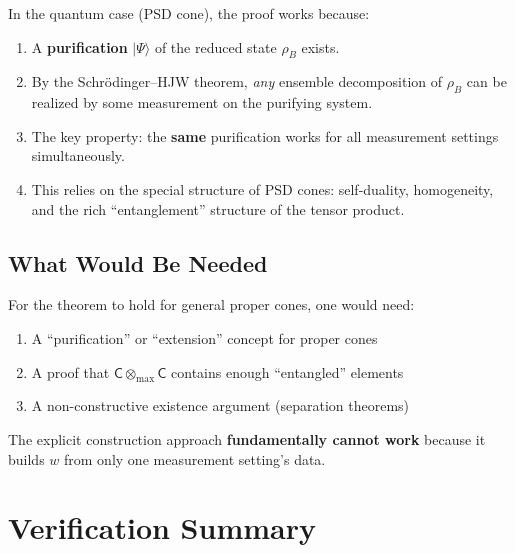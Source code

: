 \documentclass[11pt,a4paper]{article}
\theoremstyle{definition}
\newcommand{\C}{\mathsf{C}}
\newcommand{\tmax}{\otimes_{\max}}
\begin{document}
In the quantum case (PSD cone), the proof works because:

\begin{enumerate}
    \item A \textbf{purification} $|\Psi\rangle$ of the reduced state $\rho_B$ exists.

    \item By the Schr\"odinger--HJW theorem, \emph{any} ensemble decomposition of $\rho_B$ can be realized by some measurement on the purifying system.

    \item The key property: the \textbf{same} purification works for all measurement settings simultaneously.

    \item This relies on the special structure of PSD cones: self-duality, homogeneity, and the rich ``entanglement'' structure of the tensor product.
\end{enumerate}

\subsection{What Would Be Needed}

For the theorem to hold for general proper cones, one would need:

\begin{enumerate}
    \item A ``purification'' or ``extension'' concept for proper cones
    \item A proof that $\C \tmax \C$ contains enough ``entangled'' elements
    \item A non-constructive existence argument (separation theorems)
\end{enumerate}

The explicit construction approach \textbf{fundamentally cannot work} because it builds $w$ from only one measurement setting's data.

\section{Verification Summary}
\end{document}
